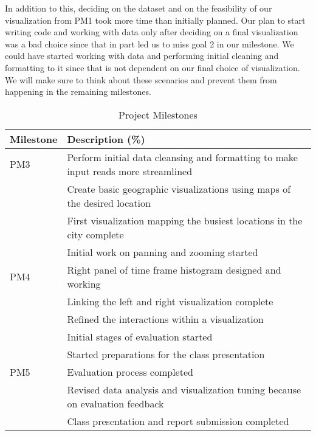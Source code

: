 In addition to this, deciding on the dataset and on the feasibility of our visualization from PM1 took more time than initially planned. Our plan to start writing code and working with data only after deciding on a final visualization was a bad choice since that in part led us to miss goal 2 in our milestone. We could have started working with data and performing initial cleaning and formatting to it since that is not dependent on our final choice of visualization. We will make sure to think about these scenarios and prevent them from happening in the remaining milestones.

\begin{table}[h]
 \caption{Project Milestones}\vspace{1ex} %
 \label{tab:milestones}
 \scriptsize
 \centering %
   \begin{tabular}{p{2cm}|p{6cm}}
     Milestone & Description (\%)\\
   \hline
     PM3 & Perform initial data cleansing and formatting to make input reads more streamlined\\
         & Create basic geographic visualizations using maps of the desired location\\
         & First visualization mapping the busiest locations in the city complete\\
         & Initial work on panning and zooming started\\
     PM4 & Right panel of time frame histogram designed and working\\
         & Linking the left and right visualization complete\\
	     & Refined the interactions within a visualization\\
	     & Initial stages of evaluation started\\
	     & Started preparations for the class presentation\\
     PM5 & Evaluation process completed\\
         & Revised data analysis and visualization tuning because on evaluation feedback\\
         & Class presentation and report submission completed\\
   \end{tabular}
\end{table}
